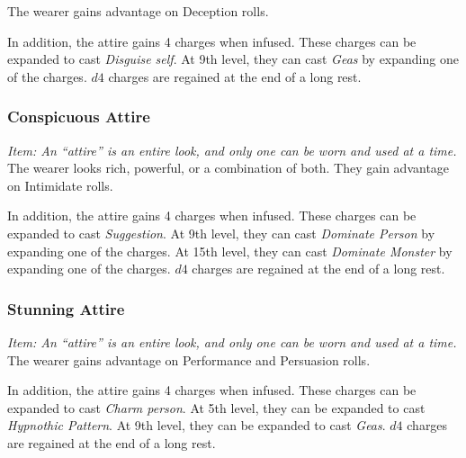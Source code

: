 \documentclass[twocolumn]{dndbook}
\begin{document}
The wearer gains advantage on Deception rolls.\par

In addition, the attire gains 4 charges when infused.
These charges can be expanded to cast \emph{Disguise self}.
At 9th level, they can cast \emph{Geas} by expanding one of the charges.
$d4$ charges are regained at the end of a long rest.

\subsubsection{Conspicuous Attire}
\emph{Item: An ``attire'' is an entire look, and only one can be worn and used at a time.}
The wearer looks rich, powerful, or a combination of both.
They gain advantage on Intimidate rolls.\par

In addition, the attire gains 4 charges when infused.
These charges can be expanded to cast \emph{Suggestion}.
At 9th level, they can cast \emph{Dominate Person} by expanding one of the charges.
At 15th level, they can cast \emph{Dominate Monster} by expanding one of the charges.
$d4$ charges are regained at the end of a long rest.

\subsubsection{Stunning Attire}
\emph{Item: An ``attire'' is an entire look, and only one can be worn and used at a time.}
The wearer gains advantage on Performance and Persuasion rolls.

In addition, the attire gains 4 charges when infused.
These charges can be expanded to cast \emph{Charm person}.
At 5th level, they can be expanded to cast \emph{Hypnothic Pattern}.
At 9th level, they can be expanded to cast \emph{Geas}.
$d4$ charges are regained at the end of a long rest.
\end{document}
